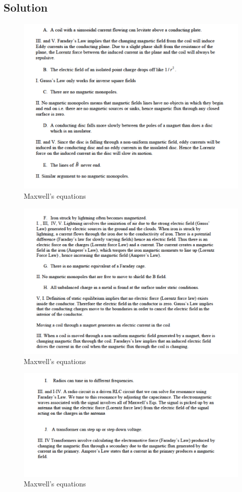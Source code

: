 \documentclass[solutions]{esg8022pset}
\begin{document}
\subsection{Solution}
\begin{figure}[H]
    \centering
    \includegraphics[width = 15cm]{max_gen_sola}
    \caption{Maxwell's equations}
  \end{figure}
  \begin{figure}[H]
    \centering
    \includegraphics[width = 15cm]{max_gen_solb}
    \caption{Maxwell's equations}
  \end{figure}
  \begin{figure}[H]
    \centering
    \includegraphics[width = 15cm]{max_gen_solc}
    \caption{Maxwell's equations}
  \end{figure}
\end{document}
